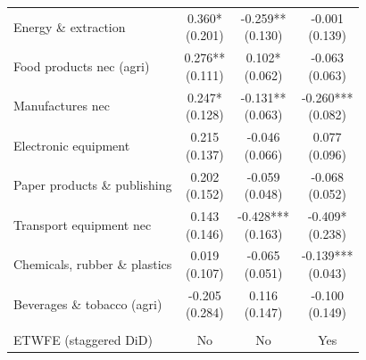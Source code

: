 \begin{table}[t]
\begin{tabular*}{\linewidth}{@{\extracolsep{\fill}}l|ccc}
Energy \& extraction & \shortstack[l]{0.360* \\(0.201)} & \shortstack[l]{-0.259** \\(0.130)} & \shortstack[l]{-0.001 \\(0.139)} \\ 
Food products nec (agri) & \shortstack[l]{0.276** \\(0.111)} & \shortstack[l]{0.102* \\(0.062)} & \shortstack[l]{-0.063 \\(0.063)} \\ 
Manufactures nec & \shortstack[l]{0.247* \\(0.128)} & \shortstack[l]{-0.131** \\(0.063)} & \shortstack[l]{-0.260*** \\(0.082)} \\ 
Electronic equipment & \shortstack[l]{0.215 \\(0.137)} & \shortstack[l]{-0.046 \\(0.066)} & \shortstack[l]{0.077 \\(0.096)} \\ 
Paper products \& publishing & \shortstack[l]{0.202 \\(0.152)} & \shortstack[l]{-0.059 \\(0.048)} & \shortstack[l]{-0.068 \\(0.052)} \\ 
Transport equipment nec & \shortstack[l]{0.143 \\(0.146)} & \shortstack[l]{-0.428*** \\(0.163)} & \shortstack[l]{-0.409* \\(0.238)} \\ 
Chemicals, rubber \& plastics & \shortstack[l]{0.019 \\(0.107)} & \shortstack[l]{-0.065 \\(0.051)} & \shortstack[l]{-0.139*** \\(0.043)} \\ 
Beverages \& tobacco (agri) & \shortstack[l]{-0.205 \\(0.284)} & \shortstack[l]{0.116 \\(0.147)} & \shortstack[l]{-0.100 \\(0.149)} \\ 
\midrule\addlinespace[2.5pt]
\multicolumn{4}{l}{{\itshape \bfseries B. Specification}} \\[2.5pt] 
\midrule\addlinespace[2.5pt]
ETWFE (staggered DiD) & No & No & Yes \\ 

\end{tabular*}
\end{table}
